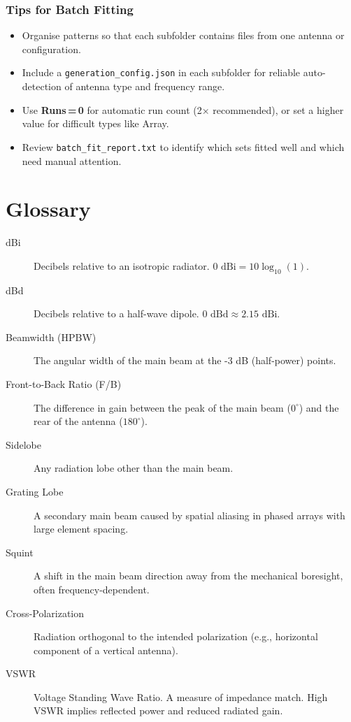 \documentclass[11pt,a4paper]{article}
\begin{document}
\subsubsection*{Tips for Batch Fitting}
\begin{itemize}
    \item Organise patterns so that each subfolder contains files from one antenna or configuration.
    \item Include a \texttt{generation\_config.json} in each subfolder for reliable auto-detection of antenna type and frequency range.
    \item Use \textbf{Runs\,=\,0} for automatic run count (2$\times$ recommended), or set a higher value for difficult types like Array.
    \item Review \texttt{batch\_fit\_report.txt} to identify which sets fitted well and which need manual attention.
\end{itemize}

\newpage
\section{Glossary}

\begin{description}
    \item[dBi] Decibels relative to an isotropic radiator. $0 \text{ dBi} = 10 \log_{10}(1)$.
    \item[dBd] Decibels relative to a half-wave dipole. $0 \text{ dBd} \approx 2.15 \text{ dBi}$.
    \item[Beamwidth (HPBW)] The angular width of the main beam at the -3 dB (half-power) points.
    \item[Front-to-Back Ratio (F/B)] The difference in gain between the peak of the main beam ($0^\circ$) and the rear of the antenna ($180^\circ$).
    \item[Sidelobe] Any radiation lobe other than the main beam.
    \item[Grating Lobe] A secondary main beam caused by spatial aliasing in phased arrays with large element spacing.
    \item[Squint] A shift in the main beam direction away from the mechanical boresight, often frequency-dependent.
    \item[Cross-Polarization] Radiation orthogonal to the intended polarization (e.g., horizontal component of a vertical antenna).
    \item[VSWR] Voltage Standing Wave Ratio. A measure of impedance match. High VSWR implies reflected power and reduced radiated gain.
\end{description}
\end{document}
